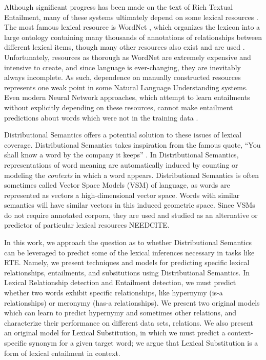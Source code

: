 \documentclass[letterpaper]{article}
\begin{document}
Although significant progress has been made on the text of
Rich Textual Entailment, many of these systems ultimately depend on some lexical
resources
\cite{beltagy:2014:semeval,bjerva:2014:semeval,lai:2014:semeval,marelli:2014:semeval,beltagy:2016:cl}.
The most famous lexical resource is WordNet \cite{miller:1995:acm}, which organizes the lexicon into a
large ontology containing many thousands of annotations of relationships
between different lexical items, though many other resources also exist
and are used \cite{baker:1998:acl,baroni:2011:gems,baroni:2012:eacl,ganitkevitch:2013:naacl,jurgens:2012:semeval,levy:2014:conll,turney:2015:nle}.
Unfortunately,
resources as thorough as WordNet are extremely expensive and intensive to
create, and since language is ever-changing, they are inevitably always
incomplete. As such, dependence on manually constructed resources represents one weak point in some Natural Language Understanding
systems. Even modern Neural Network approaches, which attempt to learn
entailments without explicitly depending on these resources, cannot make
entailment predictions about words which were not in the training data
\cite{bowman:2015:emnlp,cheng:2016:arxiv}.

Distributional Semantics offers a potential solution to these issues of lexical
coverage. Distributional Semantics takes inspiration from the famous quote,
``You shall know a word by the company it keeps'' \cite{firth:1957:la}. In
Distributional Semantics, representations of word meaning are automatically
induced by counting or modeling the {\em contexts} in which a word appears.
Distributional Semantics is often sometimes called Vector Space Models (VSM) of
language, as words are represented as vectors a high-dimensional vector space.
Words with similar semantics will have similar vectors in this induced
geometric space. Since VSMs do not require annotated corpora, they are used and
studied as an alternative or predictor of particular lexical resources NEEDCITE.

In this work, we approach the question as to whether Distributional Semantics
can be leveraged to predict some of the lexical inferences necessary in tasks
like RTE. Namely, we present techniques and models for predicting specific
lexical relationships, entailments, and subsitutions using Distributional
Semantics. In Lexical Relationship detection and Entailment detection, we must
predict whether two words exhibit specific relationships, like hypernymy (is-a
relationships) or meronymy (has-a relationships). We present two original
models which can learn to predict hypernymy and sometimes other relations,
and characterize their performance on different data sets, relations. We also
present an original model for Lexical Substitution, in which we must predict a
context-specific synonym for a given target word; we argue that Lexical
Substitution is a form of lexical entailment in context.
\end{document}
